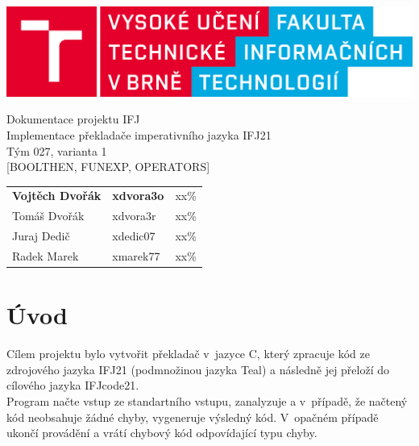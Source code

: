 \documentclass[11pt]{article}
\begin{document}
    \begin{titlepage}
        \begin{center}
            \includegraphics[width=1\linewidth]{fit logo.png} \\
            
            
            \Huge{Dokumentace projektu IFJ} \\ 
            \LARGE{Implementace překladače imperativního jazyka IFJ21} \\
            \Large{Tým 027, varianta 1} \\
            \Large{[BOOLTHEN, FUNEXP, OPERATORS]}
            
        \end{center}
        \hfill
        \begin{center}
        \LARGE
            \begin{tabular}{l  l  l}
                \textbf{Vojtěch Dvořák} & \textbf{xdvora3o} & \; xx\% \\
                 Tomáš Dvořák & xdvora3r & \; xx\% \\
                 Juraj Dedič &  xdedic07 & \; xx\% \\
                 Radek Marek & xmarek77 & \; xx\%
            \end{tabular}
        \end{center}
    \end{titlepage}
    
    \setcounter{page}{1}
    \tableofcontents
    \clearpage
    \section{Úvod}
        Cílem projektu bylo vytvořit překladač v~jazyce C, který zpracuje kód ze zdrojového jazyka IFJ21 (podmnožinou jazyka Teal) a následně jej přeloží do cílového jazyka IFJcode21. \\
    	\indent Program načte vstup ze standartního vstupu, zanalyzuje a v~případě, že načtený kód neobsahuje žádné chyby, vygeneruje výsledný kód. V~opačném případě ukončí provádění a vrátí chybový kód odpovídající typu chyby.
    \vspace{10mm}
\end{document}
